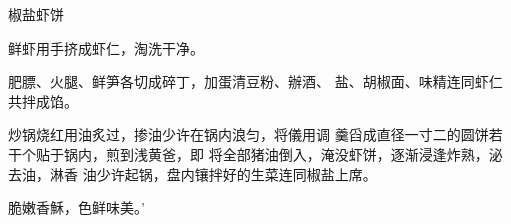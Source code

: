 \begin{recipe}{椒盐虾饼}

\ingredients


\cooking

\step 鲜虾用手挤成虾仁，淘洗干净。

\step 肥膘、火腿、鲜笋各切成碎丁，加蛋清豆粉、辦酒、 盐、胡椒面、味精连同虾仁共拌成馅。

炒锅烧红用油炙过，掺油少许在锅内浪匀，将儀用调 羹舀成直径一寸二的圆饼若干个贴于锅内，煎到浅黄爸，即 将全部猪油倒入，淹没虾饼，逐渐浸逢炸熟，泌去油，淋香 油少许起锅，盘内镶拌好的生菜连同椒盐上席。

\notes

脆嫩香穌，色鲜味美。’

\end{recipe}

